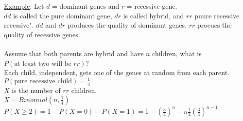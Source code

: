     \underline{Example}: Let $d$ = dominant genes and $r$ = recessive gene.\\
      $dd$ is called the pure dominant gene, $dr$ is called hybrid, and $rr$
      puure recessive recessive". $dd$ and $dr$ produces the quality of
      dominant genes. $rr$ procues the quality of recessive genes.\\\\
      Assume that both parents are hybrid and have $n$ children, what is $P(
      \text{at least two will be $rr$})$?\\
      Each child, independent, gets one of the genes at random from each 
      parent.\\
      $P(\text{pure recessive child}) = \frac{1}{4}$\\
      $X$ is the number of $rr$ children.\\
      $X = Binomial(n, \frac{1}{4})$\\
      $P(X \ge 2) = 1 - P(X = 0) - P(X = 1) = 1 - (\frac{3}{4})^n - n\frac{1}{4}
      (\frac{3}{4})^{n-1}$\\
